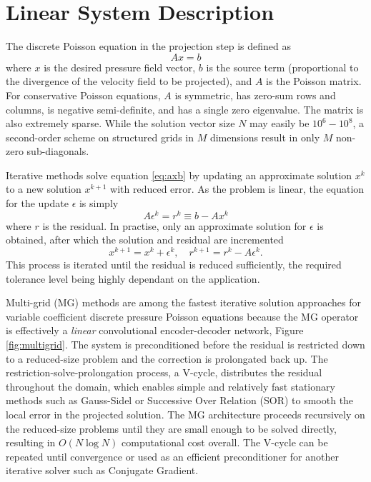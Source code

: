 \documentclass[review]{elsarticle}
\begin{document}
\section{Linear System Description}

The discrete Poisson equation in the projection step is defined as
\begin{equation}\label{eq:axb}
    A x = b
\end{equation}
where $x$ is the desired pressure field vector, $b$ is the source term (proportional to the divergence of the velocity field to be projected), and $A$ is the Poisson matrix. For conservative Poisson equations, $A$ is symmetric, has zero-sum rows and columns, is negative semi-definite, and has a single zero eigenvalue. The matrix is also extremely sparse. While the solution vector size $N$ may easily be $10^6-10^8$, a second-order scheme on structured grids in $M$ dimensions result in only $M$ non-zero sub-diagonals.

Iterative methods solve equation \ref{eq:axb} by updating an approximate solution $x^k$ to a new solution $x^{k+1}$ with reduced error. As the problem is linear, the equation for the update $\epsilon$ is simply
\begin{equation}\label{eq:aer} 
    A \epsilon^k = r^k \equiv b - Ax^k
\end{equation}
where $r$ is the residual. In practise, only an approximate solution for $\epsilon$ is obtained, after which the solution and residual are incremented
\begin{equation}\label{eq:increment}
    x^{k+1} = x^k+\epsilon^k, \quad r^{k+1} = r^k-A\epsilon^k.
\end{equation}
This process is iterated until the residual is reduced sufficiently, the required tolerance level being highly dependant on the application.

Multi-grid (MG) methods are among the fastest iterative solution approaches for variable coefficient discrete pressure Poisson equations because the MG operator is effectively a \textit{linear} convolutional encoder-decoder network, Figure \ref{fig:multigrid}. The system is preconditioned before the residual is restricted down to a reduced-size problem and the correction is prolongated back up. 
The restriction-solve-prolongation process, a V-cycle, distributes the residual throughout the domain, which enables simple and relatively fast stationary methods such as Gauss-Sidel or Successive Over Relation (SOR) to smooth the local error in the projected solution. The MG architecture proceeds recursively on the reduced-size problems until they are small enough to be solved directly, resulting in $O(N\log N)$ computational cost overall. The V-cycle can be repeated until convergence or used as an efficient preconditioner for another iterative solver such as Conjugate Gradient. 
\end{document}
